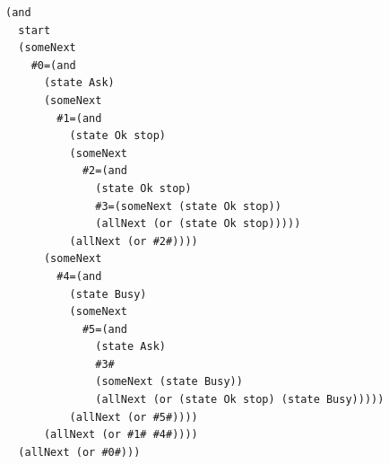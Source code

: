 \begin{lstlisting}[language={},basicstyle=\ttfamily\footnotesize,breaklines=true]
(and
  start
  (someNext
    #0=(and
      (state Ask)
      (someNext
        #1=(and
          (state Ok stop)
          (someNext
            #2=(and
              (state Ok stop)
              #3=(someNext (state Ok stop))
              (allNext (or (state Ok stop)))))
          (allNext (or #2#))))
      (someNext
        #4=(and
          (state Busy)
          (someNext
            #5=(and
              (state Ask)
              #3#
              (someNext (state Busy))
              (allNext (or (state Ok stop) (state Busy)))))
          (allNext (or #5#))))
      (allNext (or #1# #4#))))
  (allNext (or #0#)))
\end{lstlisting}
